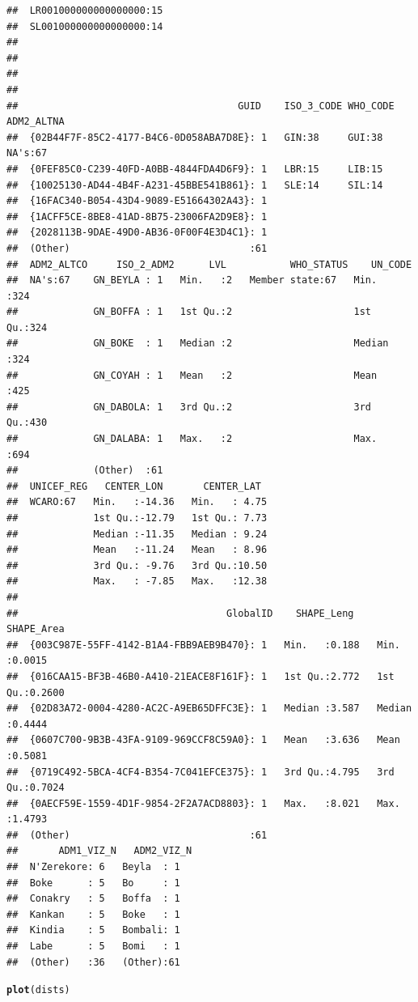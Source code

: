 \documentclass{article}\usepackage{graphicx, color}
\makeatletter
\newcommand{\hlfunctioncall}[1]{\textcolor[rgb]{0.501960784313725,0,0.329411764705882}{\textbf{#1}}}%
\newenvironment{kframe}{%
 \def\at@end@of@kframe{}%
 \ifinner\ifhmode%
  \def\at@end@of@kframe{\end{minipage}}%
  \begin{minipage}{\columnwidth}%
 \fi\fi%
 \def\FrameCommand##1{\hskip\@totalleftmargin \hskip-\fboxsep
 \colorbox{shadecolor}{##1}\hskip-\fboxsep
     \hskip-\linewidth \hskip-\@totalleftmargin \hskip\columnwidth}%
 \MakeFramed {\advance\hsize-\width
   \@totalleftmargin\z@ \linewidth\hsize
   \@setminipage}}%
 {\par\unskip\endMakeFramed%
 \at@end@of@kframe}
\newenvironment{knitrout}{}{} %
\makeatother
\begin{document}
\begin{knitrout}
\begin{kframe}
\begin{verbatim}
##  LR001000000000000000:15                                  
##  SL001000000000000000:14                                  
##                                                           
##                                                           
##                                                           
##                                                           
##                                      GUID    ISO_3_CODE WHO_CODE ADM2_ALTNA
##  {02B44F7F-85C2-4177-B4C6-0D058ABA7D8E}: 1   GIN:38     GUI:38   NA's:67   
##  {0FEF85C0-C239-40FD-A0BB-4844FDA4D6F9}: 1   LBR:15     LIB:15             
##  {10025130-AD44-4B4F-A231-45BBE541B861}: 1   SLE:14     SIL:14             
##  {16FAC340-B054-43D4-9089-E51664302A43}: 1                                 
##  {1ACFF5CE-8BE8-41AD-8B75-23006FA2D9E8}: 1                                 
##  {2028113B-9DAE-49D0-AB36-0F00F4E3D4C1}: 1                                 
##  (Other)                               :61                                 
##  ADM2_ALTCO     ISO_2_ADM2      LVL           WHO_STATUS    UN_CODE   
##  NA's:67    GN_BEYLA : 1   Min.   :2   Member state:67   Min.   :324  
##             GN_BOFFA : 1   1st Qu.:2                     1st Qu.:324  
##             GN_BOKE  : 1   Median :2                     Median :324  
##             GN_COYAH : 1   Mean   :2                     Mean   :425  
##             GN_DABOLA: 1   3rd Qu.:2                     3rd Qu.:430  
##             GN_DALABA: 1   Max.   :2                     Max.   :694  
##             (Other)  :61                                              
##  UNICEF_REG   CENTER_LON       CENTER_LAT   
##  WCARO:67   Min.   :-14.36   Min.   : 4.75  
##             1st Qu.:-12.79   1st Qu.: 7.73  
##             Median :-11.35   Median : 9.24  
##             Mean   :-11.24   Mean   : 8.96  
##             3rd Qu.: -9.76   3rd Qu.:10.50  
##             Max.   : -7.85   Max.   :12.38  
##                                             
##                                    GlobalID    SHAPE_Leng      SHAPE_Area    
##  {003C987E-55FF-4142-B1A4-FBB9AEB9B470}: 1   Min.   :0.188   Min.   :0.0015  
##  {016CAA15-BF3B-46B0-A410-21EACE8F161F}: 1   1st Qu.:2.772   1st Qu.:0.2600  
##  {02D83A72-0004-4280-AC2C-A9EB65DFFC3E}: 1   Median :3.587   Median :0.4444  
##  {0607C700-9B3B-43FA-9109-969CCF8C59A0}: 1   Mean   :3.636   Mean   :0.5081  
##  {0719C492-5BCA-4CF4-B354-7C041EFCE375}: 1   3rd Qu.:4.795   3rd Qu.:0.7024  
##  {0AECF59E-1559-4D1F-9854-2F2A7ACD8803}: 1   Max.   :8.021   Max.   :1.4793  
##  (Other)                               :61                                   
##       ADM1_VIZ_N   ADM2_VIZ_N
##  N'Zerekore: 6   Beyla  : 1  
##  Boke      : 5   Bo     : 1  
##  Conakry   : 5   Boffa  : 1  
##  Kankan    : 5   Boke   : 1  
##  Kindia    : 5   Bombali: 1  
##  Labe      : 5   Bomi   : 1  
##  (Other)   :36   (Other):61
\end{verbatim}
\begin{alltt}
\hlfunctioncall{plot}(dists)
\end{alltt}
\end{kframe}


\end{knitrout}
\end{document}
